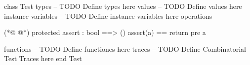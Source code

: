 \begin{vdmpp}[breaklines=true]
class Test
types
-- TODO Define types here
values
-- TODO Define values here
instance variables
-- TODO Define instance variables here
operations

(*@
\label{assert:10}
@*)
 protected assert : bool ==> ()
 assert(a) == return 
 pre a
 
functions
-- TODO Define functiones here
traces
-- TODO Define Combinatorial Test Traces here
end Test
\end{vdmpp}
